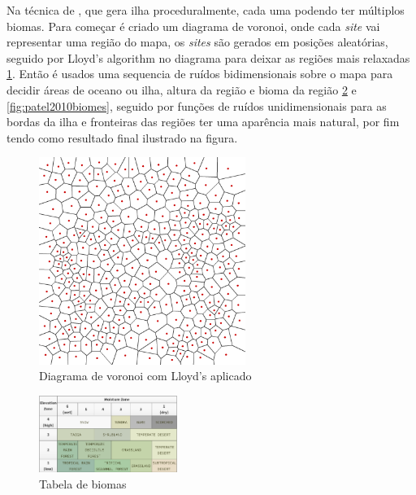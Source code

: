 Na técnica de \cite{patel2010polygonal}, que gera ilha proceduralmente, cada uma podendo ter
múltiplos biomas. Para começar é criado um diagrama de voronoi, onde cada \textit{site}
vai representar uma região do mapa, os \textit{sites} são gerados em posições
aleatórias, seguido por Lloyd's algorithm no diagrama para
deixar as regiões mais relaxadas \ref{fig:voronoi-2-lloyd}.
Então é usados uma sequencia de ruídos bidimensionais sobre o mapa para decidir
áreas de oceano ou ilha, altura da região e bioma da região
\ref{fig:patel2010tablebiomes} e \ref{fig:patel2010biomes}, seguido por funções
de ruídos unidimensionais para as bordas da ilha e fronteiras das regiões ter
uma aparência mais natural, por fim tendo como resultado final ilustrado na
figura. 
\begin{figure}[H]
    \centering
    \includegraphics[width=0.6\textwidth]{figuras/voronoi-2-lloyd.png}
    \caption{Diagrama de voronoi com Lloyd's aplicado}
    \label{fig:voronoi-2-lloyd}
\end{figure}

\begin{figure}[H]
    \centering
    \includegraphics[width=0.4\textwidth]{figuras/patel2010tablebiomes.png}
    \caption{Tabela de biomas}
    \label{fig:patel2010tablebiomes}
\end{figure}

